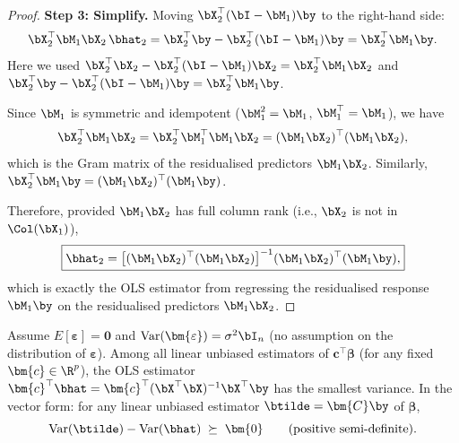 \begin{proof}
\noindent\textbf{Step 3: Simplify.}
Moving $\bX_2^\top(\bI-\bM_1)\by$ to the right-hand side:
\[
  \bX_2^\top\bM_1\bX_2\,\bhat_2
  = \bX_2^\top\by - \bX_2^\top(\bI-\bM_1)\by
  = \bX_2^\top\bM_1\by.
\]
Here we used $\bX_2^\top\bX_2 - \bX_2^\top(\bI-\bM_1)\bX_2 = \bX_2^\top\bM_1\bX_2$
and $\bX_2^\top\by - \bX_2^\top(\bI-\bM_1)\by = \bX_2^\top\bM_1\by$.

Since $\bM_1$ is symmetric and idempotent ($\bM_1^2 = \bM_1$, $\bM_1^\top = \bM_1$),
we have
\[
  \bX_2^\top\bM_1\bX_2 = \bX_2^\top\bM_1^\top\bM_1\bX_2
  = (\bM_1\bX_2)^\top(\bM_1\bX_2),
\]
which is the Gram matrix of the residualised predictors $\bM_1\bX_2$.
Similarly, $\bX_2^\top\bM_1\by = (\bM_1\bX_2)^\top(\bM_1\by)$.

Therefore, provided $\bM_1\bX_2$ has full column rank (i.e., $\bX_2$ is not
in $\Col(\bX_1)$),
\[
  \boxed{\bhat_2
  = \bigl[(\bM_1\bX_2)^\top(\bM_1\bX_2)\bigr]^{-1}(\bM_1\bX_2)^\top(\bM_1\by),}
\]
which is exactly the OLS estimator from regressing the residualised response
$\bM_1\by$ on the residualised predictors $\bM_1\bX_2$.
\end{proof}



\begin{theorem}\label{thm:gm-full}
Assume $E[\bm{\varepsilon}] = \bm{0}$ and
$\text{Var}(\bm{\varepsilon}) = \sigma^2\bI_n$
(no assumption on the distribution of $\bm{\varepsilon}$).
Among all linear unbiased estimators of $\bm{c}^\top\bm{\beta}$
(for any fixed $\bm{c}\in\R^p$), the OLS estimator
$\bm{c}^\top\bhat = \bm{c}^\top(\bX^\top\bX)^{-1}\bX^\top\by$
has the smallest variance.
In the vector form: for any linear unbiased estimator
$\btilde = \bm{C}\by$ of $\bm{\beta}$,
\[
  \text{Var}(\btilde) - \text{Var}(\bhat) \;\succeq\; \bm{0}
  \qquad\text{(positive semi-definite).}
\]
\end{theorem}

